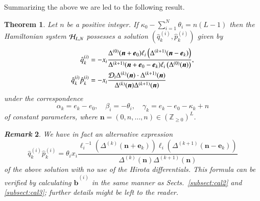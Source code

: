 \documentclass[12pt]{article}
\newtheorem{thm}{Theorem}[section]
\newtheorem{remark}[thm]{\it Remark}
\numberwithin{equation}{section}
\begin{document}
Summarizing the above we are led to the following result.

\begin{thm} 
\label{thm:hgi}
Let $n$ be a positive integer.
If $\kappa_0-\sum_{i=1}^N \theta_i=n(L-1)$
then
the Hamiltonian system
${\cal H}_{L,N}$ 
possesses 
a solution 
$(\hat{q}_k^{(i)},\hat{p}_k^{(i)})$ given by
\begin{align*}
\hat{q}_k^{(i)} &=
- x_i
\frac{ \Delta^{(0)}({\boldsymbol n}+{\boldsymbol e}_0)  
\ell_i 
\left( \Delta^{(k+1)} ({\boldsymbol n}-{\boldsymbol e}_k) \right)
}{ \Delta^{(k+1)} ({\boldsymbol n}+{\boldsymbol e}_0-{\boldsymbol e}_k) 
\ell_i \left( \Delta^{(0)} ({\boldsymbol n}) \right) 
 },
\\
\hat{q}_k^{(i)}  \hat{p}_k^{(i)}
&=
-x_i \frac{{\cal D}_i  \Delta^{(k)}({\boldsymbol n})  \cdot \Delta^{(k+1)}({\boldsymbol n})  }{ \Delta^{(k)}({\boldsymbol n})  \Delta^{(k+1)}({\boldsymbol n})  }
\end{align*}
under the correspondence
\[
\alpha_k=e_k-e_0, \quad 
\beta_i=  - \theta_i, \quad  
\gamma_k= e_k-e_0-\kappa_k+n
\]
of constant parameters,
where
${\boldsymbol n}=(0,n,\ldots,n) \in ({\mathbb Z}_{\geq 0})^L$.
\end{thm}


\begin{remark}\rm
We have in fact an alternative expression 
\[
\hat{q}_k^{(i)}  \hat{p}_k^{(i)}
=
\theta_i x_i 
\frac{
{\ell_i}^{-1} 
\left( \Delta^{(k)} ({\boldsymbol n}+{\boldsymbol e}_k) \right)
 \ell_i 
\left( \Delta^{(k+1)} ({\boldsymbol n}-{\boldsymbol e}_k) \right)
 }{ \Delta^{(k)}({\boldsymbol n})  \Delta^{(k+1)}({\boldsymbol n})  }
\]
of the above solution 
with no use of the Hirota differentials. 
This formula can be verified by calculating
$\hat{\boldsymbol b}^{(i)}$ 
in the same manner as Sects.~\ref{subsect:cal2} and \ref{subsect:cal3};
further details might be left to the reader.
\end{remark}
\end{document}
